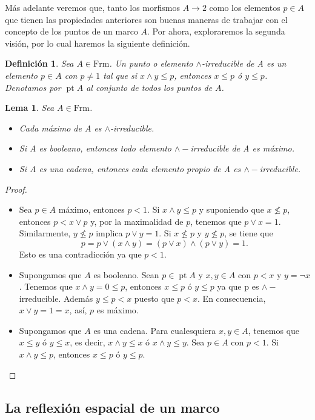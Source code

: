 \documentclass[12pt,letterpaper,titlepage]{article}
\newtheorem*{defn}{Definición}
\newtheorem{lemma}{Lema}
\theoremstyle{definition}
\renewcommand\sup{\vee}
\renewcommand\inf{\wedge}
\newcommand\<{\langle}
\renewcommand\>{\rangle}
\newcommand{\Frm}{\mathrm{Frm}}
\DeclareMathOperator{\pt}{pt}
\begin{document}
Más adelante veremos que, tanto los morfismos $A\to 2$ como los
elementos $p\in A$ que tienen las propiedades anteriores
son buenas maneras de trabajar con el concepto de los puntos
de un marco $A$.
Por ahora, exploraremos la segunda visión, por lo cual
haremos la siguiente definición.
\begin{defn}
  Sea $A\in \Frm$. Un punto o elemento $\inf$-irreducible de A es un elemento $p\in A$ con $p\neq 1$ tal que si $x\inf y\leq p$, entonces $x\leq p$ ó $y\leq p$. Denotamos por $\pt A$ al conjunto de todos los puntos de $A$.
\end{defn}
\begin{lemma}
  Sea $A\in \Frm$.
  \begin{itemize}
      \item Cada máximo de $A$ es $\inf$-irreducible.
      \item Si A es booleano, entonces todo elemento $\inf-$irreducible de A es máximo.
      \item Si A es una cadena, entonces cada elemento propio de A es $\inf-$irreducible.
  \end{itemize}
\end{lemma}
\begin{proof}\quad
  \begin{itemize}
      \item Sea $p\in A$ máximo, entonces $p<1$. Si $x\inf y\leq p$ y suponiendo que $x\not\leq p$, entonces $p<x\sup p$ y, por la maximalidad de $p$, tenemos que $p\sup x=1$. Similarmente, $y\not\leq p$ implica $p\sup y=1$. Si $x\not\leq p$ y $y\not\leq p$, se tiene que 
      \[p=p\sup (x\inf y)=(p\sup x)\inf(p\sup y)=1.\]
      Esto es una contradicción ya que $p<1$.
      \item Supongamos que $A$ es booleano. Sean $p\in\pt A$ y $x,y\in A$ con $p<x$ y $y=\neg x$. Tenemos que $x\inf y=0\leq p$, entonces $x\leq p$ ó $y\leq p$ ya que p es $\inf-$irreducible. Además $y\leq p<x$ puesto que $p<x$. En consecuencia, $x\sup y=1=x$, así, $p$ es máximo.
      \item Supongamos que $A$ es una cadena. Para cualesquiera $x,y\in A$, tenemos que $x\leq y$ ó $y\leq x$, es decir, $x\inf y\leq x$ ó $x\inf y\leq y$. Sea $p\in A$ con $p<1$. Si $x\inf y\leq p$, entonces $x\leq p$ ó $y\leq p$.
  \end{itemize}
\end{proof}

\subsection{La reflexión espacial de un marco}
\end{document}
